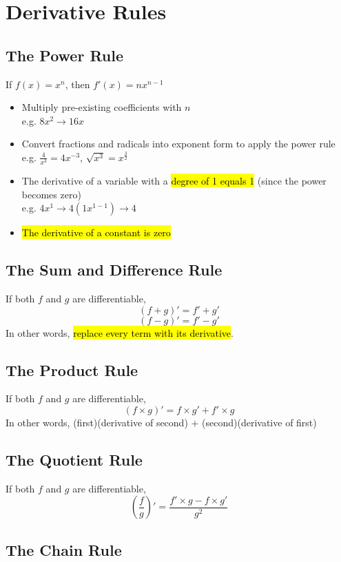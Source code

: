 \documentclass[a4paper,12pt]{article}
\begin{document}
\section{Derivative Rules}

\subsection{The Power Rule}
\begin{center}
If $f(x) = x^n$, then $f'(x) = nx^{n-1}$
\end{center}
\begin{itemize}
    \item{Multiply pre-existing coefficients with $n$ \\ e.g. $8x^2 \longrightarrow 16x$}
    \item{Convert fractions and radicals into exponent form to apply the power rule \\ e.g. $\frac{4}{x^3} = 4x^{-3}$, $\sqrt{x^3} = x^{\frac{3}{2}}$}
    \item{The derivative of a variable with a \hl{degree of 1 equals 1} (since the power becomes zero) \\ e.g. $4x^1 \longrightarrow 4(1x^{1-1}) \longrightarrow 4$}
    \item{\hl{The derivative of a constant is zero}}
\end{itemize}

\subsection{The Sum and Difference Rule}
If both $f$ and $g$ are differentiable,
$$(f+g)' = f' + g'$$
$$(f-g)' = f' - g'$$
In other words, \hl{replace every term with its derivative}.

\subsection{The Product Rule}
If both $f$ and $g$ are differentiable,
$$(f \times g)' = f \times g' + f' \times g$$
In other words, (first)(derivative of second) $+$ (second)(derivative of first)

\subsection{The Quotient Rule}
If both $f$ and $g$ are differentiable,
$$\left( \frac{f}{g} \right)' = \frac{f' \times g - f \times g'}{g^2}$$

\subsection{The Chain Rule}
\end{document}
